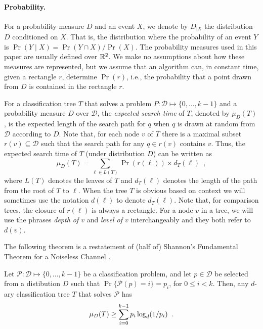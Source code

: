 \documentclass{patmorin}
\newcommand{\depth}{d}
\begin{document}
\paragraph{Probability.}

For a probability measure $D$ and an event $X$, we denote by $D_{|X}$
the distribution $D$ conditioned on $X$.  That is, the distribution where
the probability of an event $Y$ is $\Pr(Y\mid X)=\Pr(Y\cap X)/\Pr(X)$.
The probability measures used in this paper are usually defined over
$\mathbb{R}^2$.  We make no assumptions about how these measures are represented,
but we assume that an algorithm can, in constant time, given a rectangle
$r$, determine $\Pr(r)$, i.e., the probability that a point drawn from
$D$ is contained in the rectangle $r$.

For a classification tree $T$ that solves a problem
$P:\mathcal{D}\mapsto\{0,\ldots,k-1\}$ and a probability measure $D$
over $\mathcal{D}$, the \emph{expected search time} of $T$, denoted by
$\mu_D(T)$, is the expected length of the search path for $q$ when $q$ is
drawn at random from $\mathcal{D}$ according to $D$.  Note that, for each
node $v$ of $T$ there is a maximal subset $r(v)\subseteq \mathcal{D}$
such that the search path for any $q\in r(v)$ contains $v$.  Thus,
the expected search time of $T$ (under distribution $D$) can be written as
\[
     \mu_D(T) = \sum_{\ell\in L(T)} \Pr(r(\ell))\times \depth_T(\ell)
	\enspace ,
\]
where $L(T)$ denotes the leaves of $T$ and $\depth_T(\ell)$ denotes the
length of the path from the root of $T$ to $\ell$.  When the tree $T$
is obvious based on context we will sometimes use the notation
$d(\ell)$ to denote $d_T(\ell)$. Note that, for
comparison trees, the closure of $r(\ell)$ is always a rectangle.  For
a node $v$ in a tree, we will use the phrases \emph{depth of $v$} and
\emph{level of $v$} interchangeably and they both refer to $d(v)$. 

The following theorem is a restatement of (half of) Shannon's
Fundamental Theorem for a Noiseless Channel \cite[Theorem 9]{s48}.
\begin{thm}
Let $\mathcal{P}:\mathcal{D}\mapsto \{0,\ldots,k-1\}$ be a classification
problem, and let $p\in \mathcal{D}$ be selected from a distibution $D$ such
that $\Pr\{\mathcal{P}(p)= i\}=p_i$, for $0\le i< k$.  Then, any
$d$-ary classification tree $T$ that solves $\mathcal{P}$ has
\begin{equation}
     \mu_D(T) \ge \sum_{i=0}^{k-1} p_i\log_d(1/p_i) \enspace .
	\eqlabel{shannon}
\end{equation}
\end{thm}
\end{document}
